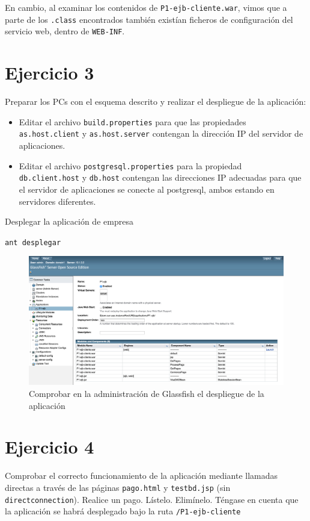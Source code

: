 \documentclass[a4paper, 10pt]{article}
\begin{document}
	 En cambio, al examinar los contenidos de \texttt{P1-ejb-cliente.war}, vimos que a parte de los \texttt{.class} encontrados también existían ficheros de configuración del servicio web, dentro de \texttt{WEB-INF}.
	
\newpage
 \section{Ejercicio 3}
 \begin{mdframed}
Preparar los PCs con el esquema descrito y realizar el despliegue de la aplicación:
\begin{itemize}
\item Editar el archivo \texttt{build.properties} para que las propiedades \\ \texttt{as.host.client} y \texttt{as.host.server}
contengan la dirección IP del servidor de aplicaciones.
\item Editar el archivo \texttt{postgresql.properties} para la propiedad \\ \texttt{db.client.host} y \texttt{db.host} contengan las
direcciones IP adecuadas para que el servidor de aplicaciones se conecte al postgresql, ambos
estando en servidores diferentes.
\end{itemize}

\noindent Desplegar la aplicación de empresa

\texttt{ant desplegar}
\end{mdframed}
	 \begin{figure}[hbtp]
	 	\centering
	 	\includegraphics[width=1.1\textwidth]{pantallazos/ejercicio3.png}
	 	\caption{Comprobar en la administración de Glassfish el despliegue de la aplicación}
	 \end{figure}
 
 \newpage
 \section{Ejercicio 4}
 \begin{mdframed}
 Comprobar el correcto funcionamiento de la aplicación mediante llamadas directas a través de
las páginas \texttt{pago.html} y \texttt{testbd.jsp} (sin \\ \texttt{directconnection}). Realice un pago. Lístelo. Elimínelo. Téngase en
cuenta que la aplicación se habrá desplegado bajo la ruta \texttt{/P1-ejb-cliente} 
\end{mdframed}
\end{document}
